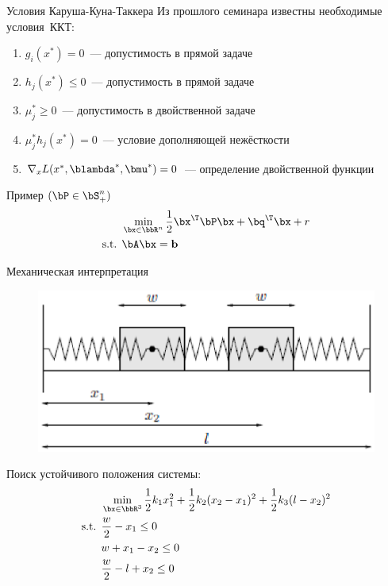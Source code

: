 \documentclass[12pt,russian]{beamer}
\begin{document}
\begin{frame}{Условия Каруша-Куна-Таккера}
Из прошлого семинара известны необходимые условия~ККТ: 
\begin{enumerate}
\item $g_i(x^*) = 0$~--- допустимость в прямой задаче
\item $h_j(x^*) \leq 0$~--- допустимость в прямой задаче
\item $ \mu^*_j \geq 0$~--- допустимость в двойственной задаче
\item $\mu^*_jh_j(x^*) = 0$~--- условие дополняющей нежёсткости
\item $\nabla_x L(x^*, \blambda^*, \bmu^*) = 0$~--- определение двойственной функции
\end{enumerate}
Пример $(\bP \in \bS^n_+)$
\begin{equation*}
\begin{split}
& \min\limits_{\bx \in \bbR^n} \frac{1}{2}\bx^{\T}\bP\bx + \bq^{\T}\bx + r\\
\text{s.t. } & \bA\bx = \mathbf{b}
\end{split}
\end{equation*}
\end{frame}

\begin{frame}{Механическая интерпретация}
\begin{figure}
\centering
\includegraphics[scale=0.5]{kkt_mechanics.eps}
\end{figure}
Поиск устойчивого положения системы:
\begin{equation*}
\begin{split}
& \min_{\bx \in \bbR^3} \frac{1}{2}k_1x_1^2 + \frac{1}{2}k_2(x_2 - x_1)^2 + \frac{1}{2}k_3 (l - x_2)^2\\
\text{s.t. } & \frac{w}{2} - x_1 \leq 0\\
& w + x_1 - x_2 \leq 0\\
& \frac{w}{2} - l + x_2 \leq 0
\end{split}
\end{equation*}

\end{frame}
\end{document}
